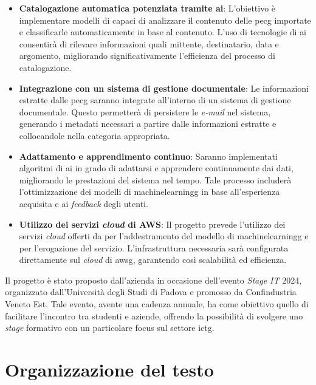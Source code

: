 \begin{itemize}
    \item \textbf{Catalogazione automatica potenziata tramite \gls{ai}}: L'obiettivo è implementare modelli di  capaci di analizzare il contenuto delle \gls{pecg} importate e classificarle automaticamente in base al contenuto. L'uso di tecnologie di \gls{ai} consentirà di rilevare informazioni quali mittente, destinatario, data e argomento, migliorando significativamente l'efficienza del processo di catalogazione.

    \item \textbf{Integrazione con un sistema di gestione documentale}: Le informazioni estratte dalle \gls{pecg} saranno integrate all'interno di un sistema di gestione documentale. Questo permetterà di persistere le \emph{e-mail} nel sistema, generando i metadati necessari a partire dalle informazioni estratte e collocandole nella categoria appropriata.

    \item \textbf{Adattamento e apprendimento continuo}: Saranno implementati algoritmi di \gls{ai} in grado di adattarsi e apprendere continuamente dai dati, migliorando le prestazioni del sistema nel tempo. Tale processo includerà l'ottimizzazione dei modelli di \gls{machinelearningg} in base all'esperienza acquisita e ai \emph{feedback} degli utenti.

    \item \textbf{Utilizzo dei servizi \emph{cloud} di AWS}: Il progetto prevede l'utilizzo dei servizi \emph{cloud} offerti da  per l'addestramento del modello di \gls{machinelearningg} e per l'erogazione del servizio. L'infrastruttura necessaria sarà configurata direttamente sul \emph{cloud} di \gls{awsg}, garantendo così scalabilità ed efficienza.
\end{itemize}

Il progetto è stato proposto dall'azienda in occasione dell'evento \emph{Stage IT} 2024, organizzato dall'Università degli Studi di Padova e promosso da Confindustria Veneto Est. Tale evento, avente una cadenza annuale, ha come obiettivo quello di facilitare l'incontro tra studenti e aziende, offrendo la possibilità di svolgere uno \emph{stage} formativo con un particolare focus sul settore \gls{ictg}.


\section{Organizzazione del testo}


